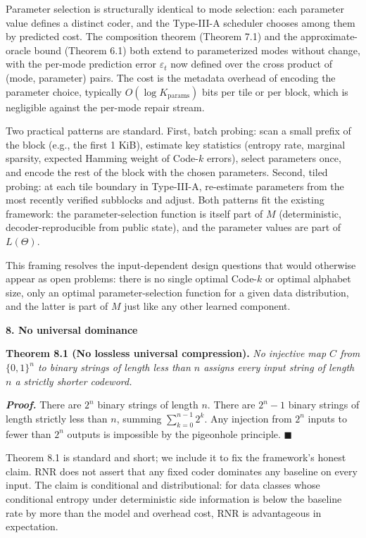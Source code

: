 \documentclass[
]{article}
\begin{document}
Parameter selection is structurally identical to mode selection: each
parameter value defines a distinct coder, and the Type-III-A scheduler
chooses among them by predicted cost. The composition theorem
(Theorem 7.1) and the approximate-oracle bound (Theorem 6.1) both
extend to parameterized modes without change, with the per-mode
prediction error $\varepsilon_t$ now defined over the cross product of
(mode, parameter) pairs. The cost is the metadata overhead of encoding
the parameter choice, typically $O(\log K_{\text{params}})$ bits per
tile or per block, which is negligible against the per-mode repair
stream.

Two practical patterns are standard. First, batch probing: scan a
small prefix of the block (e.g., the first 1 KiB), estimate key
statistics (entropy rate, marginal sparsity, expected Hamming weight
of Code-$k$ errors), select parameters once, and encode the rest of
the block with the chosen parameters. Second, tiled probing: at each
tile boundary in Type-III-A, re-estimate parameters from the most
recently verified subblocks and adjust. Both patterns fit the
existing framework: the parameter-selection function is itself part
of $M$ (deterministic, decoder-reproducible from public state), and
the parameter values are part of $L(\Theta)$.

This framing resolves the input-dependent design questions that would
otherwise appear as open problems: there is no single optimal
Code-$k$ or optimal alphabet size, only an optimal
parameter-selection function for a given data distribution, and the
latter is part of $M$ just like any other learned component.

\textbf{8. No universal dominance}

\textbf{Theorem 8.1 (No lossless universal compression).} \emph{No
injective map $C$ from $\{0,1\}^n$ to binary strings of length less
than $n$ assigns every input string of length $n$ a strictly shorter
codeword.}

\emph{\textbf{Proof.}} There are $2^n$ binary strings of length $n$.
There are $2^n - 1$ binary strings of length strictly less than $n$,
summing $\sum_{k=0}^{n-1} 2^k$. Any injection from $2^n$ inputs to
fewer than $2^n$ outputs is impossible by the pigeonhole principle.
\hfill$\blacksquare$

Theorem 8.1 is standard and short; we include it to fix the
framework's honest claim. RNR does not assert that any fixed coder
dominates any baseline on every input. The claim is conditional and
distributional: for data classes whose conditional entropy under
deterministic side information is below the baseline rate by more than
the model and overhead cost, RNR is advantageous in expectation.
\end{document}

